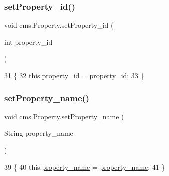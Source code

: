 \subsubsection{\texorpdfstring{set\+Property\+\_\+id()}{setProperty\_id()}}
{\footnotesize\ttfamily void cms.\+Property.\+set\+Property\+\_\+id (\begin{DoxyParamCaption}\item[{int}]{property\+\_\+id }\end{DoxyParamCaption})\hspace{0.3cm}{\ttfamily [inline]}}


\begin{DoxyCode}
31                                                 \{
32         this.\mbox{\hyperlink{classcms_1_1_property_a599f759f4e0076578bf5a39c494a978d}{property\_id}} = \mbox{\hyperlink{classcms_1_1_property_a599f759f4e0076578bf5a39c494a978d}{property\_id}};
33     \}
\end{DoxyCode}
\mbox{\label{classcms_1_1_property_aac6a658c4a914669b1def4c968c513b5}} 
\subsubsection{\texorpdfstring{set\+Property\+\_\+name()}{setProperty\_name()}}
{\footnotesize\ttfamily void cms.\+Property.\+set\+Property\+\_\+name (\begin{DoxyParamCaption}\item[{String}]{property\+\_\+name }\end{DoxyParamCaption})\hspace{0.3cm}{\ttfamily [inline]}}


\begin{DoxyCode}
39                                                        \{
40         this.\mbox{\hyperlink{classcms_1_1_property_a35fcc951b43bfcb151fae422a0a61a1a}{property\_name}} = \mbox{\hyperlink{classcms_1_1_property_a35fcc951b43bfcb151fae422a0a61a1a}{property\_name}};
41     \}
\end{DoxyCode}
\mbox{\label{classcms_1_1_property_aff794f4d992112f05233969709e02813}} 
